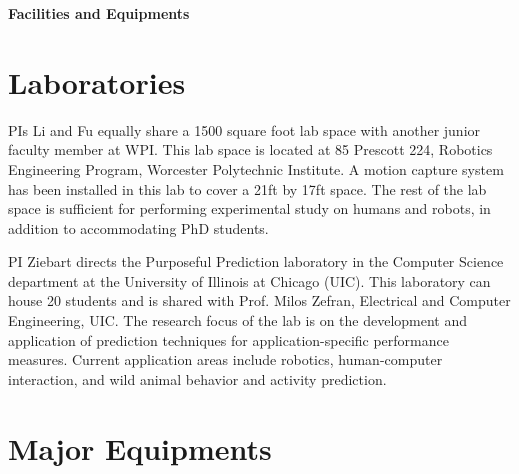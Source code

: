 \pagebreak

\begin{center}
	{\Large \bf Facilities and Equipments}\\
\end{center}

\vspace{0.5em}
\section{Laboratories}\label{sec:Lab}

PIs Li and Fu equally share a 1500 square foot lab space with another junior faculty member at WPI. This lab space is located at 85 Prescott 224, Robotics Engineering Program, Worcester Polytechnic Institute. A motion capture system has been installed in this lab to cover a 21ft by 17ft space. The rest of the lab space is sufficient for performing experimental study on humans and robots, in addition to accommodating PhD students.

PI Ziebart directs the Purposeful Prediction laboratory in the Computer Science department at the University of Illinois at Chicago (UIC). This laboratory can house 20 students and is shared with Prof. Milos Zefran, Electrical and Computer Engineering, UIC. The research focus of the lab is on the development and application of
prediction techniques for application-specific performance measures. Current application areas include robotics, human-computer interaction, and wild animal behavior and activity prediction.





\section{Major Equipments}\label{sec:equip}


